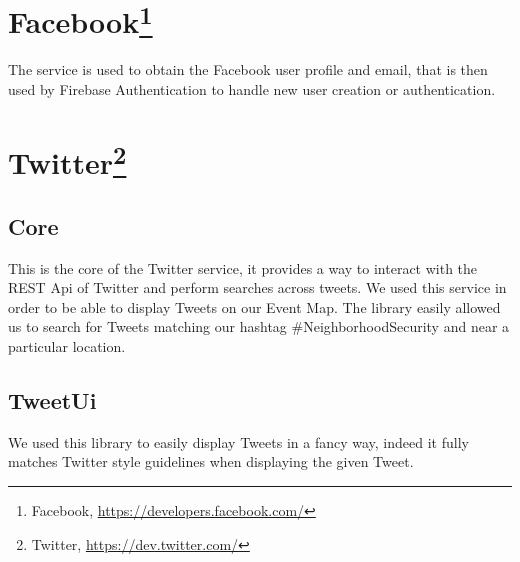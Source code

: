 \documentclass[a4paper]{scrreprt}
\begin{document}
\section[Facebook]{Facebook\footnote{Facebook, \url{https://developers.facebook.com/}}}
The service is used to obtain the Facebook user profile and email, that is then used by Firebase Authentication to handle new user creation or authentication.

\section[Twitter]{Twitter\footnote{Twitter, \url{https://dev.twitter.com/}}}
\subsection{Core}
This is the core of the Twitter service, it provides a way to interact with the REST Api of Twitter and perform searches across tweets. We used this service in order to be able to display Tweets on our Event Map. The library easily allowed us to search for Tweets matching our hashtag \#NeighborhoodSecurity and near a particular location.
\subsection{TweetUi}
We used this library to easily display Tweets in a fancy way, indeed it fully matches Twitter style guidelines when displaying the given Tweet.
\end{document}
